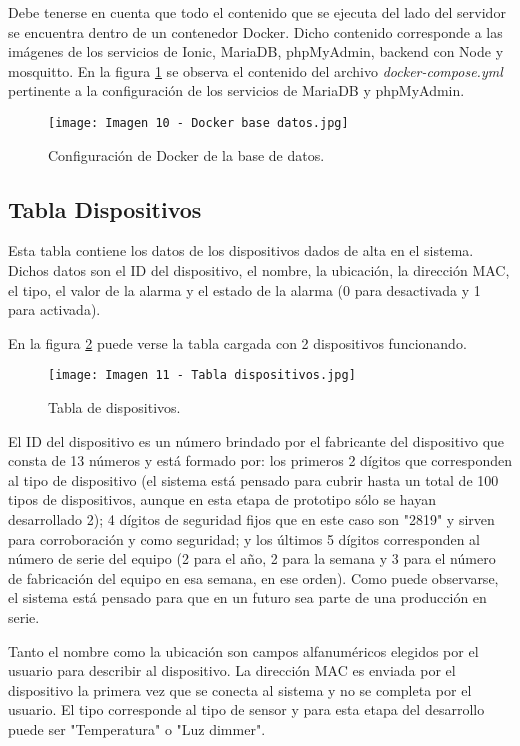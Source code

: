 Debe tenerse en cuenta que todo el contenido que se ejecuta del lado del servidor se encuentra dentro de un contenedor Docker. Dicho contenido corresponde a las imágenes de los servicios de Ionic, MariaDB, phpMyAdmin, backend con Node y mosquitto. En la figura \ref{fig:10} se observa el contenido del archivo \textit{docker-compose.yml} pertinente a la configuración de los servicios de MariaDB y phpMyAdmin.

\begin{figure}[h]
\centering
\texttt{[image: Imagen 10 - Docker base datos.jpg]}
\caption[Docker base datos]{Configuración de Docker de la base de datos. \footnotemark}
\label{fig:10}
\end{figure}

\subsection{Tabla Dispositivos}

Esta tabla contiene los datos de los dispositivos dados de alta en el sistema. Dichos datos son el ID del dispositivo, el nombre, la ubicación, la dirección MAC, el tipo, el valor de la alarma y el estado de la alarma (0 para desactivada y 1 para activada).

En la figura \ref{fig:11} puede verse la tabla cargada con 2 dispositivos funcionando.

\begin{figure}[h]
\centering
\texttt{[image: Imagen 11 - Tabla dispositivos.jpg]}
\caption[Tabla dispositivos]{Tabla de dispositivos. \footnotemark}
\label{fig:11}
\end{figure}

El ID del dispositivo es un número brindado por el fabricante del dispositivo que consta de 13 números y está formado por: los primeros 2 dígitos que corresponden al tipo de dispositivo (el sistema está pensado para cubrir hasta un total de 100 tipos de dispositivos, aunque en esta etapa de prototipo sólo se hayan desarrollado 2); 4 dígitos de seguridad fijos que en este caso son "2819" y sirven para corroboración y como seguridad; y los últimos 5 dígitos corresponden al número de serie del equipo (2 para el año, 2 para la semana y 3 para el número de fabricación del equipo en esa semana, en ese orden). Como puede observarse, el sistema está pensado para que en un futuro sea parte de una producción en serie.

Tanto el nombre como la ubicación son campos alfanuméricos elegidos por el usuario para describir al dispositivo. La dirección MAC es enviada por el dispositivo la primera vez que se conecta al sistema y no se completa por el usuario. El tipo corresponde al tipo de sensor y para esta etapa del desarrollo puede ser "Temperatura" o "Luz dimmer".

